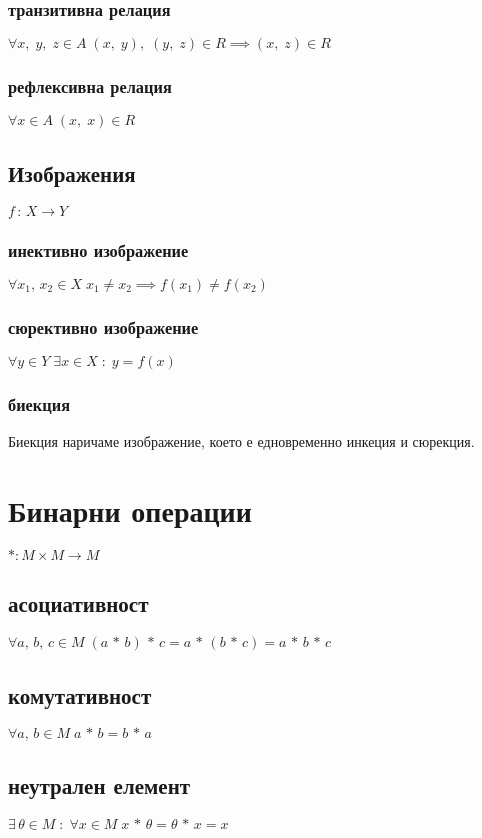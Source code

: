 \documentclass[12pt]{article}
\begin{document}
    \subsubsection{транзитивна релация}
    \(\forall x, \; y, \; z \in A \; (x, \; y), \; (y, \; z) \in R \implies (x, \; z) \in R\)
    \subsubsection{рефлексивна релация}
    \(\forall x \in A \; (x, \; x) \in R\)
    \subsection{Изображения}
    \(f \, : \, X \to Y\)\\
    \subsubsection{инективно изображение}
    \(\forall x_1, \, x_2 \in X \; x_1 \neq x_2 \implies f(x_1) \neq f(x_2)\)
    \subsubsection{сюрективно изображение}
    \(\forall y \in Y \; \exists x \in X \; : \; y = f(x)\)
    \subsubsection{биекция}
    Биекция наричаме изображение, което е едновременно инкеция и сюрекция.
    \section{Бинарни операции}
    \(*: M  \times M \to M\)
    \subsection{асоциативност}
    \(\forall a, \, b, \, c \in M \; (a \, * \, b) \, * \, c = a \, * \, (b \, * \, c) = a \, * \, b \, * \, c\)
    \subsection{комутативност}
    \(\forall a, \, b \in M \; a \, * \, b = b \, * \, a\)
    \subsection{неутрален елемент}
    \(\exists \, \theta \in M \; : \; \forall x \in M \; x \, * \, \theta = \theta \, * \, x = x\)
\end{document}
